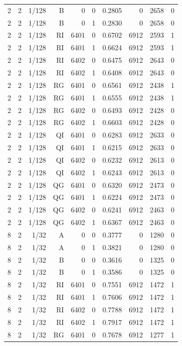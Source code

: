 \begin{longtable}{lrrrrrrrrr}
2 & 2 & 1/128 & B & 0 & 0 & 0.2805 & 0 & 2658 & 0 \\
2 & 2 & 1/128 & B & 0 & 1 & 0.2830 & 0 & 2658 & 0 \\
2 & 2 & 1/128 & RI & 6401 & 0 & 0.6702 & 6912 & 2593 & 1 \\
2 & 2 & 1/128 & RI & 6401 & 1 & 0.6624 & 6912 & 2593 & 1 \\
2 & 2 & 1/128 & RI & 6402 & 0 & 0.6475 & 6912 & 2643 & 0 \\
2 & 2 & 1/128 & RI & 6402 & 1 & 0.6408 & 6912 & 2643 & 0 \\
2 & 2 & 1/128 & RG & 6401 & 0 & 0.6561 & 6912 & 2438 & 1 \\
2 & 2 & 1/128 & RG & 6401 & 1 & 0.6555 & 6912 & 2438 & 1 \\
2 & 2 & 1/128 & RG & 6402 & 0 & 0.6493 & 6912 & 2428 & 0 \\
2 & 2 & 1/128 & RG & 6402 & 1 & 0.6603 & 6912 & 2428 & 0 \\
2 & 2 & 1/128 & QI & 6401 & 0 & 0.6283 & 6912 & 2633 & 0 \\
2 & 2 & 1/128 & QI & 6401 & 1 & 0.6215 & 6912 & 2633 & 0 \\
2 & 2 & 1/128 & QI & 6402 & 0 & 0.6232 & 6912 & 2613 & 0 \\
2 & 2 & 1/128 & QI & 6402 & 1 & 0.6243 & 6912 & 2613 & 0 \\
2 & 2 & 1/128 & QG & 6401 & 0 & 0.6320 & 6912 & 2473 & 0 \\
2 & 2 & 1/128 & QG & 6401 & 1 & 0.6224 & 6912 & 2473 & 0 \\
2 & 2 & 1/128 & QG & 6402 & 0 & 0.6241 & 6912 & 2463 & 0 \\
2 & 2 & 1/128 & QG & 6402 & 1 & 0.6367 & 6912 & 2463 & 0 \\
8 & 2 & 1/32 & A & 0 & 0 & 0.3777 & 0 & 1280 & 0 \\
8 & 2 & 1/32 & A & 0 & 1 & 0.3821 & 0 & 1280 & 0 \\
8 & 2 & 1/32 & B & 0 & 0 & 0.3616 & 0 & 1325 & 0 \\
8 & 2 & 1/32 & B & 0 & 1 & 0.3586 & 0 & 1325 & 0 \\
8 & 2 & 1/32 & RI & 6401 & 0 & 0.7551 & 6912 & 1472 & 1 \\
8 & 2 & 1/32 & RI & 6401 & 1 & 0.7606 & 6912 & 1472 & 1 \\
8 & 2 & 1/32 & RI & 6402 & 0 & 0.7788 & 6912 & 1472 & 1 \\
8 & 2 & 1/32 & RI & 6402 & 1 & 0.7917 & 6912 & 1472 & 1 \\
8 & 2 & 1/32 & RG & 6401 & 0 & 0.7678 & 6912 & 1277 & 1 \\

\end{longtable}
